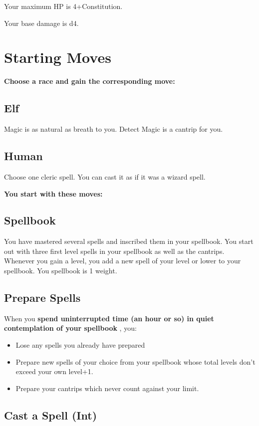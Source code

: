 Your maximum HP is 4+Constitution.


 Your base damage is d4.
\section*{Starting Moves}


{\bfseries Choose a race and gain the corresponding move:}
\subsection{Elf}


 Magic is as natural as breath to you. Detect Magic is a cantrip for you.
\subsection{Human}


 Choose one cleric spell. You can cast it as if it was a wizard spell.


\vspace{\baselineskip}
{\bfseries You start with these moves:}
\subsection{Spellbook}


 You have mastered several spells and inscribed them in your spellbook. You start out with three first level spells in your spellbook as well as the cantrips. Whenever you gain a level, you add a new spell of your level or lower to your spellbook. You spellbook is 1 weight.
\subsection{Prepare Spells}


 When you \textbf{spend uninterrupted time (an hour or so) in quiet contemplation of your spellbook}
, you:
\begin{itemize}
\item Lose any spells you already have prepared
\item Prepare new spells of your choice from your spellbook whose total levels don't exceed your own level+1.
\item Prepare your cantrips which never count against your limit.

\end{itemize}
\subsection{Cast a Spell (Int)}


